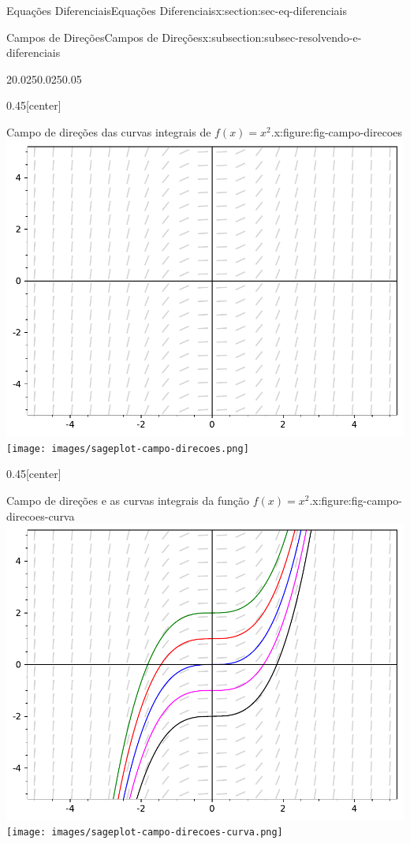 \documentclass[oneside,10pt,]{article}
\numberwithin{equation}{section}
\begin{document}
\begin{sectionptx}{Equações Diferenciais}{}{Equações Diferenciais}{}{}{x:section:sec-eq-diferenciais}
\begin{subsectionptx}{Campos de Direções}{}{Campos de Direções}{}{}{x:subsection:subsec-resolvendo-e-diferenciais}
\begin{sidebyside}{2}{0.025}{0.025}{0.05}
\begin{sbspanel}{0.45}[center]
\begin{figureptx}{Campo de direções das curvas integrais de \(f(x)=x^2\).}{x:figure:fig-campo-direcoes}{}
{\includegraphics[width=\linewidth]{images/sageplot-campo-direcoes.pdf}}%
{\texttt{[image: images/sageplot-campo-direcoes.png]}}
\tcblower
\end{figureptx}%
\end{sbspanel}%
\begin{sbspanel}{0.45}[center]%
\begin{figureptx}{Campo de direções e as curvas integrais da função \(f(x)=x^2\).}{x:figure:fig-campo-direcoes-curva}{}%
%
{\includegraphics[width=\linewidth]{images/sageplot-campo-direcoes-curva.pdf}}%
{\texttt{[image: images/sageplot-campo-direcoes-curva.png]}}
\tcblower
\end{figureptx}%

\end{sbspanel}
\end{sidebyside}
\end{subsectionptx}
\end{sectionptx}
\end{document}
